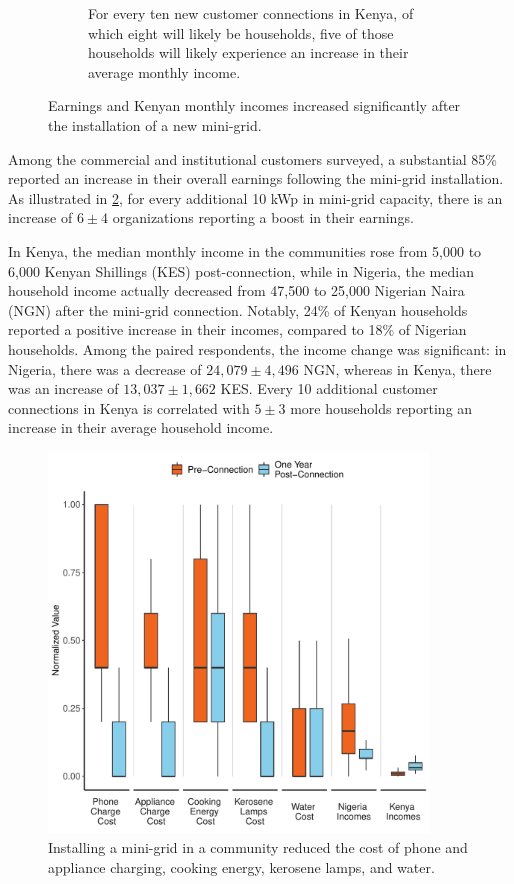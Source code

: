 \begin{figure}[t]
\begin{subfigure}[t]{0.48\textwidth}
		\caption{For every ten new customer connections in Kenya, of which eight will likely be households, five of those households will likely experience an increase in their average monthly income.}
		\label{fig:kenya_incomes}
	\end{subfigure}
	\caption{Earnings and Kenyan monthly incomes increased significantly after the installation of a new mini-grid.}
	\label{fig:economic_improvement}
\end{figure}
Among the commercial and institutional customers surveyed, a substantial 85\% reported an increase in their overall earnings following the mini-grid installation. As illustrated in \cref{fig:economic_improvement}, for every additional 10 kWp in mini-grid capacity, there is an increase of $6\pm4$ organizations reporting a boost in their earnings. 

In Kenya, the median monthly income in the communities rose from 5,000 to 6,000 Kenyan Shillings (KES) post-connection, while in Nigeria, the median household income actually decreased from 47,500 to 25,000 Nigerian Naira (NGN) after the mini-grid connection. Notably, 24\% of Kenyan households reported a positive increase in their incomes, compared to 18\% of Nigerian households. Among the paired respondents, the income change was significant: in Nigeria, there was a decrease of $24,079\pm4,496$ NGN, whereas in Kenya, there was an increase of $13,037\pm1,662$ KES. Every 10 additional customer connections in Kenya is correlated with $5\pm3$ more households reporting an increase in their average household income.

\begin{figure}[t]
	\centering
	\includegraphics[width=0.9\textwidth]{images/economic_activity_paired_results.pdf}
	\caption{Installing a mini-grid in a community reduced the cost of phone and appliance charging, cooking energy, kerosene lamps, and water.}
	\label{fig:economic_paired_results}
\end{figure}

